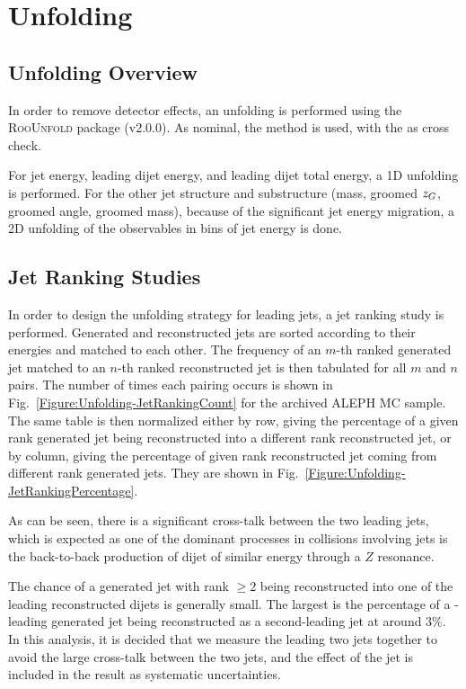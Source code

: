 \section{Unfolding}\label{Section:Unfolding}

\subsection{Unfolding Overview}

In order to remove detector effects, an unfolding is performed using the \textsc{RooUnfold} package (v2.0.0).  As nominal, the \Bayes method is used, with the \SVD as cross check.

For jet energy, leading dijet energy, and leading dijet total energy, a 1D unfolding is performed.  For the other jet structure and substructure (mass, groomed $z_G$, groomed angle, groomed mass), because of the significant jet energy migration, a 2D unfolding of the observables in bins of jet energy is done.


\subsection{Jet Ranking Studies}

In order to design the unfolding strategy for leading jets, a jet ranking study is performed.  Generated and reconstructed jets are sorted according to their energies and matched to each other.  The frequency of an $m$-th ranked generated jet matched to an $n$-th ranked reconstructed jet is then tabulated for all $m$ and $n$ pairs.  The number of times each pairing occurs is shown in Fig.~\ref{Figure:Unfolding-JetRankingCount} for the archived ALEPH MC sample.  The same table is then normalized either by row, giving the percentage of a given rank generated jet being reconstructed into a different rank reconstructed jet, or by column, giving the percentage of given rank reconstructed jet coming from different rank generated jets.  They are shown in Fig.~\ref{Figure:Unfolding-JetRankingPercentage}.

As can be seen, there is a significant cross-talk between the two leading jets, which is expected as one of the dominant processes in \ee collisions involving jets is the back-to-back production of dijet of similar energy through a $Z$ resonance.

The chance of a generated jet with rank $\geq 2$ being reconstructed into one of the leading reconstructed dijets is generally small.  The largest is the percentage of a -leading generated jet being reconstructed as a second-leading jet at around 3\%.  In this analysis, it is decided that we measure the leading two jets together to avoid the large cross-talk between the two jets, and the effect of the  jet is included in the result as systematic uncertainties.


